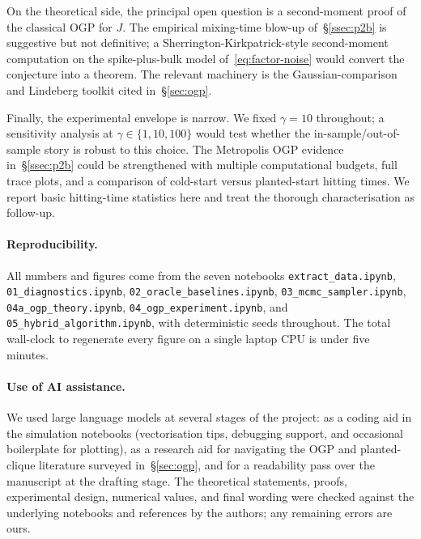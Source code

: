 On the theoretical side, the principal open question is a second-moment proof of the
classical OGP for $J$. The empirical mixing-time blow-up of~\S\ref{ssec:p2b} is
suggestive but not definitive; a Sherrington-Kirkpatrick-style second-moment
computation on the spike-plus-bulk model of~\eqref{eq:factor-noise} would convert the
conjecture into a theorem. The relevant machinery is the Gaussian-comparison and
Lindeberg toolkit cited in~\S\ref{sec:ogp}.

Finally, the experimental envelope is narrow. We fixed $\gamma=10$ throughout; a
sensitivity analysis at $\gamma\in\{1,10,100\}$ would test whether the
in-sample/out-of-sample story is robust to this choice. The Metropolis OGP evidence
in~\S\ref{ssec:p2b} could be strengthened with multiple computational budgets, full
trace plots, and a comparison of cold-start versus planted-start hitting times. We
report basic hitting-time statistics here and treat the thorough characterisation as
follow-up.

\paragraph{Reproducibility.}
All numbers and figures come from the seven notebooks
\texttt{extract\_data.ipynb}, \texttt{01\_diagnostics.ipynb},
\texttt{02\_oracle\_baselines.ipynb}, \texttt{03\_mcmc\_sampler.ipynb},
\texttt{04a\_ogp\_theory.ipynb}, \texttt{04\_ogp\_experiment.ipynb}, and
\texttt{05\_hybrid\_algorithm.ipynb}, with deterministic seeds throughout. The total
wall-clock to regenerate every figure on a single laptop CPU is under five minutes.

\paragraph{Use of AI assistance.}
We used large language models at several stages of the project: as a coding aid in
the simulation notebooks (vectorisation tips, debugging support, and occasional
boilerplate for plotting), as a research aid for navigating the OGP and
planted-clique literature surveyed in~\S\ref{sec:ogp}, and for a readability pass
over the manuscript at the drafting stage. The theoretical statements, proofs,
experimental design, numerical values, and final wording were checked against the
underlying notebooks and references by the authors; any remaining errors are ours.
